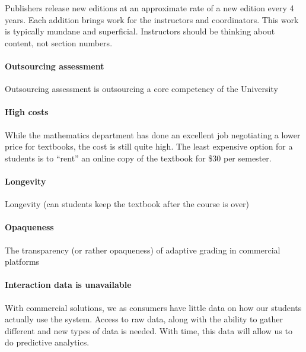 \documentclass{ximera}
\begin{document}
Publishers release new editions at an approximate rate of a new
edition every 4 years. Each addition brings work for the instructors
and coordinators. This work is typically mundane and
superficial. Instructors should be thinking about content, not section
numbers.


\paragraph{Outsourcing assessment}
Outsourcing assessment is outsourcing a core competency of the University


\paragraph{High costs}
While the mathematics department has done an excellent job negotiating
a lower price for textbooks, the cost is still quite high.  The least
expensive option for a students is to ``rent'' an online copy of the
textbook for \$30 per semester. 


\paragraph{Longevity}
Longevity (can students keep the textbook after the course is over)


\paragraph{Opaqueness}
The transparency (or rather opaqueness) of adaptive grading in commercial platforms

\paragraph{Interaction data is unavailable}

With commercial solutions, we as consumers have little data on how our
students actually use the system. Access to raw data, along with the
ability to gather different and new types of data is needed. With
time, this data will allow us to do predictive analytics.

\end{document}
